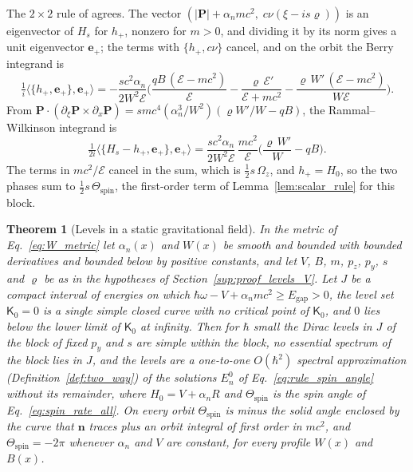 \documentclass[aps,prd,onecolumn,tightenlines,nofootinbib,notitlepage,11pt,floatfix]{revtex4-2}
\theoremstyle{indentedtheorem}
\newtheorem{theorem}{Theorem}
\begin{document}
\noindent The $2\times2$ rule of \citet{BeckerFujiieWittsten2025Bohr} agrees. The vector $(|\mathbf{P}|+\alpha_nmc^2,\;c\nu(\xi-is\varrho))$ is an eigenvector of $H_s$ for $h_+$, nonzero for $m>0$, and dividing it by its norm gives a unit eigenvector $\mathbf{e}_+$; the terms with $\{h_+,c\nu\}$ cancel, and on the orbit the Berry integrand is
\begin{equation*}
    \tfrac{1}{i}\big\langle\{h_+,\mathbf{e}_+\},\mathbf{e}_+\big\rangle = -\frac{sc^2\alpha_n}{2W^2\mathcal{E}}\Big(\frac{qB\,(\mathcal{E}-mc^2)}{\mathcal{E}}-\frac{\varrho\,\mathcal{E}'}{\mathcal{E}+mc^2}-\frac{\varrho\,W'\,(\mathcal{E}-mc^2)}{W\mathcal{E}}\Big) .
\end{equation*}
From $\mathbf{P}\cdot(\partial_\xi\mathbf{P}\times\partial_x\mathbf{P})=smc^4(\alpha_n^3/W^2)(\varrho W'/W-qB)$, the Rammal--Wilkinson integrand is
\begin{equation*}
    \tfrac{1}{2i}\big\langle\{H_s-h_+,\mathbf{e}_+\},\mathbf{e}_+\big\rangle = \frac{sc^2\alpha_n}{2W^2\mathcal{E}}\,\frac{mc^2}{\mathcal{E}}\Big(\frac{\varrho\,W'}{W}-qB\Big) .
\end{equation*}
The terms in $mc^2/\mathcal{E}$ cancel in the sum, which is $\tfrac{1}{2}s\,\Omega_z$, and $h_+=H_0$, so the two phases sum to $\tfrac{1}{2}s\,\Theta_\text{spin}$, the first-order term of Lemma~\ref{lem:scalar_rule} for this block.

\begin{theorem}[Levels in a static gravitational field]
\label{thm:levels_grav}
In the metric of Eq.~\eqref{eq:W_metric} let $\alpha_n(x)$ and $W(x)$ be smooth and bounded with bounded derivatives and bounded below by positive constants, and let $V$, $B$, $m$, $p_z$, $p_y$, $s$ and $\varrho$ be as in the hypotheses of Section~\ref{sup:proof_levels_V}. Let $J$ be a compact interval of energies on which $\hbar\omega-V+\alpha_nmc^2\geq E_\text{gap}>0$, the level set $\mathsf{K}_0=0$ is a single simple closed curve with no critical point of $\mathsf{K}_0$, and $0$ lies below the lower limit of $\mathsf{K}_0$ at infinity. Then for $\hbar$ small the Dirac levels in $J$ of the block of fixed $p_y$ and $s$ are simple within the block, no essential spectrum of the block lies in $J$, and the levels are a one-to-one $O(\hbar^2)$ spectral approximation (Definition~\ref{def:two_way}) of the solutions $E_n^0$ of Eq.~\eqref{eq:rule_spin_angle} without its remainder, where $H_0=V+\alpha_nR$ and $\Theta_\text{spin}$ is the spin angle of Eq.~\eqref{eq:spin_rate_all}. On every orbit $\Theta_\text{spin}$ is minus the solid angle enclosed by the curve that $\mathbf{n}$ traces plus an orbit integral of first order in $mc^2$, and $\Theta_\text{spin}=-2\pi$ whenever $\alpha_n$ and $V$ are constant, for every profile $W(x)$ and $B(x)$.
\end{theorem}
\end{document}
